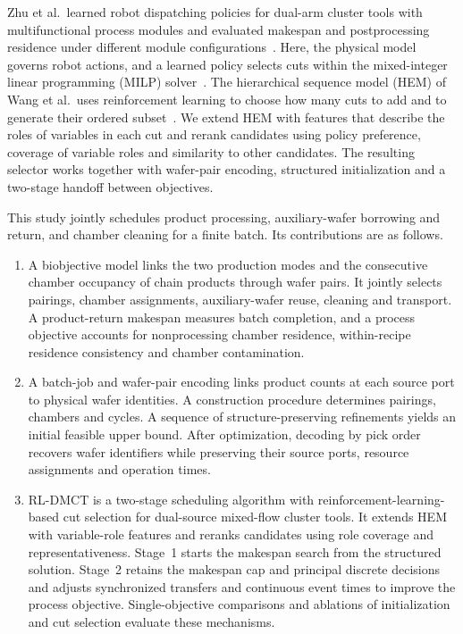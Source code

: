 \documentclass[final,5p,times,twocolumn]{elsarticle}
\begin{document}
Zhu et al.\ learned robot dispatching policies for dual-arm cluster tools with multifunctional process modules and evaluated makespan and postprocessing residence under different module configurations~\citep{zhu2026multifunction}. Here, the physical model governs robot actions, and a learned policy selects cuts within the mixed-integer linear programming (MILP) solver~\citep{tang2020cut,huang2022cutranking,paulus2022looking}. The hierarchical sequence model (HEM) of Wang et al.\ uses reinforcement learning to choose how many cuts to add and to generate their ordered subset~\citep{wang2023hem,wang2024hem}. We extend HEM with features that describe the roles of variables in each cut and rerank candidates using policy preference, coverage of variable roles and similarity to other candidates. The resulting selector works together with wafer-pair encoding, structured initialization and a two-stage handoff between objectives.

This study jointly schedules product processing, auxiliary-wafer borrowing and return, and chamber cleaning for a finite batch. Its contributions are as follows.
\begin{enumerate}[leftmargin=*]
\item A biobjective model links the two production modes and the consecutive chamber occupancy of chain products through wafer pairs. It jointly selects pairings, chamber assignments, auxiliary-wafer reuse, cleaning and transport. A product-return makespan measures batch completion, and a process objective accounts for nonprocessing chamber residence, within-recipe residence consistency and chamber contamination.
\item A batch-job and wafer-pair encoding links product counts at each source port to physical wafer identities. A construction procedure determines pairings, chambers and cycles. A sequence of structure-preserving refinements yields an initial feasible upper bound. After optimization, decoding by pick order recovers wafer identifiers while preserving their source ports, resource assignments and operation times.
\item RL-DMCT is a two-stage scheduling algorithm with reinforcement-learning-based cut selection for dual-source mixed-flow cluster tools. It extends HEM with variable-role features and reranks candidates using role coverage and representativeness. Stage~1 starts the makespan search from the structured solution. Stage~2 retains the makespan cap and principal discrete decisions and adjusts synchronized transfers and continuous event times to improve the process objective. Single-objective comparisons and ablations of initialization and cut selection evaluate these mechanisms.
\end{enumerate}
\end{document}
